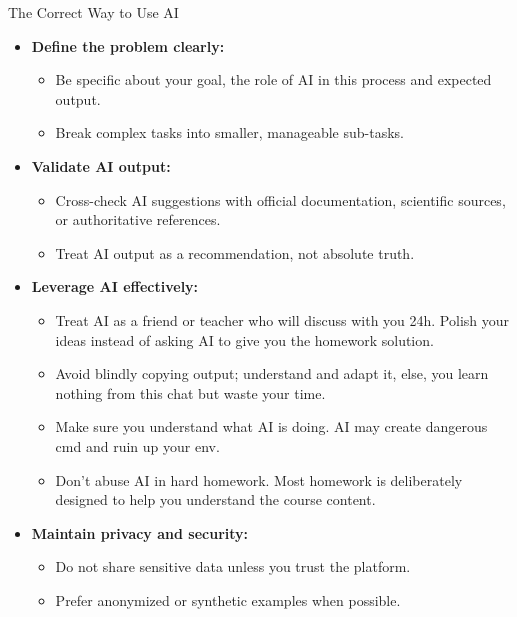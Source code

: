 \begin{frame}[fragile]{The Correct Way to Use AI}
    \begin{itemize}
        \item \textbf{Define the problem clearly:}
        \begin{itemize}
            \item Be specific about your goal, the role of AI in this process and expected output.
            \item Break complex tasks into smaller, manageable sub-tasks.
        \end{itemize}

        \item \textbf{Validate AI output:}
        \begin{itemize}
            \item Cross-check AI suggestions with official documentation, scientific sources, or authoritative references.
            \item Treat AI output as a recommendation, not absolute truth.
        \end{itemize}

        \item \textbf{Leverage AI effectively:}
        \begin{itemize}
            \item Treat AI as a friend or teacher who will discuss with you 24h. Polish your ideas instead of asking AI to give you the homework solution.
            \item Avoid blindly copying output; understand and adapt it, else, you learn nothing from this chat but waste your time.
            \item Make sure you understand what AI is doing. AI may create dangerous cmd and ruin up your env.
            \item Don't abuse AI in hard homework. Most homework is deliberately designed to help you understand the course content.
        \end{itemize}

        \item \textbf{Maintain privacy and security:}
        \begin{itemize}
            \item Do not share sensitive data unless you trust the platform.
            \item Prefer anonymized or synthetic examples when possible.
        \end{itemize}
    \end{itemize}
\end{frame}


